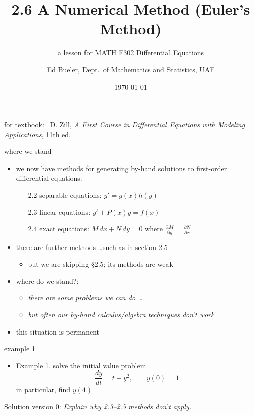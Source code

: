 \documentclass{beamer}
\title{2.6 A Numerical Method (Euler's Method)}
\subtitle{a lesson for MATH F302 Differential Equations}
\author{Ed Bueler, Dept.~of Mathematics and Statistics, UAF}
\date{\tiny \today}
\begin{document}

\begin{frame}
\titlepage

\centerline{\tiny for textbook: \, D. Zill, \emph{A First Course in Differential Equations with Modeling Applications}, 11th ed.}
\end{frame}



\begin{frame}{where we stand}

\begin{itemize}
\item we now have methods for generating by-hand solutions to first-order differential equations:
    \begin{itemize}
    \item[2.2] separable equations: $y'=g(x)h(y)$
    \item[2.3] linear equations: $y'+P(x)y=f(x)$
    \item[2.4] exact equations: $M\,dx + N\,dy=0$ where $\frac{\partial M}{\partial y} = \frac{\partial N}{\partial x}$
    \end{itemize}
\item there are further methods \dots such as in section 2.5
    \begin{itemize}
    \item but \alert{we are skipping \S 2.5}; its methods are weak
    \end{itemize}

\bigskip
\item where do we stand?:
    \begin{itemize}
    \item \emph{there are some problems we can do \dots}
    \item \emph{but often our by-hand calculus/algebra techniques \alert{don't} work}
    \end{itemize}
\item this situation is permanent
\end{itemize}
\end{frame}


\begin{frame}{example 1}

\begin{itemize}
\item Example 1.  solve the initial value problem
    $$\frac{dy}{dt} = t-y^2, \qquad y(0)=1$$
in particular, find $y(4)$
\end{itemize}

\medskip
Solution version 0: \emph{Explain why 2.3--2.5 methods don't apply.}

\vspace{50mm}
\end{frame}
\end{document}
